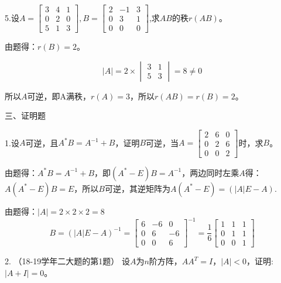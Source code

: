 \documentclass{article}
\begin{document}
5.设$A=
\begin{bmatrix}
  3 & 4 & 1\\
  0 & 2 & 0\\
  5 & 1 & 3
\end{bmatrix}
,B=
\begin{bmatrix}
  2 & -1 & 3\\
  0 & 3 & 1\\
  0 & 0 & 0
\end{bmatrix}
$,求$AB$的秩$r(AB)$。

\begin{jie}
由题得：$r(B)=2$。

\begin{equation*}
|A|=2\times
\begin{vmatrix}
3&1\\
5&3
\end{vmatrix}=8\neq0
\end{equation*}

所以$A$可逆，即A满秩，$r(A)=3$，所以$r(AB)=r(B)=2$。
\end{jie}

三、证明题

1.设$A$可逆，且$A^{*}B=A^{-1}+B$，证明$B$可逆，当$A=
\begin{bmatrix}
  2 & 6 & 0 \\
  0 & 2 & 6\\
  0 & 0 & 2
\end{bmatrix}
$时，求$B$。

\begin{zhengming}
由题得：$A^{*}B=A^{-1}+B$，即$(A^*-E)B=A^{-1}$，两边同时左乘$A$得：$A(A^*-E)B=E$，所以$B$可逆，其逆矩阵为$A(A^*-E)=(|A|E-A)$.

由题得：$|A|=2\times2\times 2=8$
\begin{equation*}
B=(|A|E-A)^{-1}=\begin{bmatrix}
  6 & -6 & 0 \\
  0 & 6 & -6\\
  0 & 0 & 6
\end{bmatrix}^{-1}=\frac{1}{6}\begin{bmatrix}
  1 & 1 & 1 \\
  0 & 1 & 1\\
  0 & 0 & 1
\end{bmatrix}
\end{equation*}
\end{zhengming}

2. \textcolor[rgb]{1.00,0.00,0.00}{（18-19学年二大题的第1题）}
设$A$为$n$阶方阵，$AA^{T}=I$，$|A|<0$，证明:$|A+I|=0$。
\end{document}
